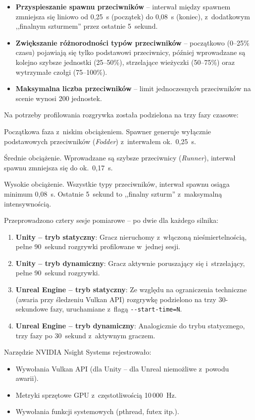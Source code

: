 \begin{itemize}
    \item \textbf{Przyspieszanie spawnu przeciwników} -- interwał między
    spawnem zmniejsza się liniowo od 0,25~s (początek) do 0,08~s (koniec),
    z~dodatkowym ,,finalnym szturmem'' przez ostatnie 5~sekund.
    \item \textbf{Zwiększanie różnorodności typów przeciwników} -- 
    początkowo (0--25\% czasu) pojawiają się tylko podstawowi
    przeciwnicy, później wprowadzane są kolejno szybsze jednostki
    (25--50\%), strzelające wieżyczki (50--75\%) oraz wytrzymałe
    czołgi (75--100\%).
    \item \textbf{Maksymalna liczba przeciwników} -- limit jednoczesnych
    przeciwników na scenie wynosi 200 jednostek.
\end{itemize}
\newpage
Na potrzeby profilowania rozgrywka została podzielona na trzy fazy czasowe:

Początkowa faza z~niskim obciążeniem. Spawner generuje wyłącznie podstawowych
przeciwników (\emph{Fodder}) z~interwałem ok.~0,25~s.

Średnie obciążenie. Wprowadzane są szybsze przeciwnicy (\emph{Runner}),
interwał spawnu zmniejsza się do ok.~0,17~s.

Wysokie obciążenie. Wszystkie typy przeciwników,
interwał spawnu osiąga minimum 0,08~s. Ostatnie 5~sekund to
,,finalny szturm'' z~maksymalną intensywnością.

\label{subsubsec:procedura-zbierania}

Przeprowadzono cztery sesje pomiarowe -- po dwie dla każdego silnika:

\begin{enumerate}
    \item \textbf{Unity -- tryb statyczny}: Gracz nieruchomy z~włączoną
    nieśmiertelnością, pełne 90~sekund rozgrywki profilowane w~jednej sesji.
    \item \textbf{Unity -- tryb dynamiczny}: Gracz aktywnie poruszający się
    i~strzelający, pełne 90~sekund rozgrywki.
    \item \textbf{Unreal Engine -- tryb statyczny}: Ze względu na ograniczenia
    techniczne (awaria przy śledzeniu Vulkan API) rozgrywkę podzielono na
    trzy 30-sekundowe fazy, uruchamiane z~flagą \texttt{-{}-start-time=N}.
    \item \textbf{Unreal Engine -- tryb dynamiczny}: Analogicznie do trybu
    statycznego, trzy fazy po 30~sekund z~aktywnym graczem.
\end{enumerate}

Narzędzie NVIDIA Nsight Systems rejestrowało:
\begin{itemize}
    \item Wywołania Vulkan API (dla Unity -- dla Unreal niemożliwe z~powodu
    awarii).
    \item Metryki sprzętowe GPU z~częstotliwością 10\,000~Hz.
    \item Wywołania funkcji systemowych (pthread, futex itp.).
\end{itemize}
